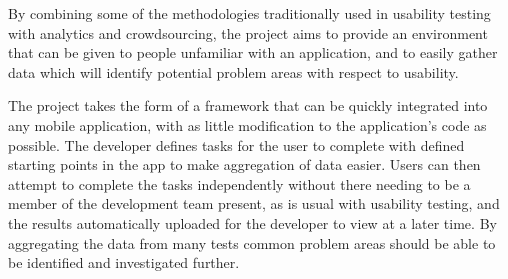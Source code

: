By combining some of the methodologies traditionally used in usability testing
with analytics and crowdsourcing, the project aims to provide an environment
that can be given to people unfamiliar with an application, and to easily
gather data which will identify potential problem areas with respect to
usability.

The project takes the form of a framework that can be quickly integrated into
any mobile application, with as little modification to the application's code
as possible. The developer defines tasks for the user to complete with defined
starting points in the app to make aggregation of data easier. Users can then
attempt to complete the tasks independently without there needing to be
a member of the development team present, as is usual with usability testing,
and the results automatically uploaded for the developer to view at a later
time. By aggregating the data from many tests common problem areas should be
able to be identified and investigated further.
